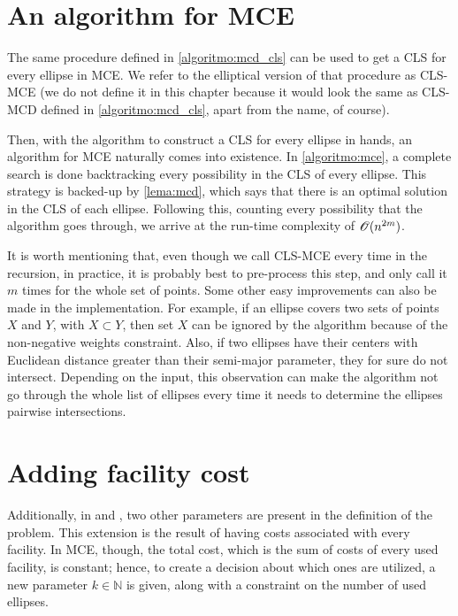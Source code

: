 \section{An algorithm for MCE}

The same procedure defined in \autoref{algoritmo:mcd_cls} can be used to get a CLS for every ellipse in MCE. We refer to the elliptical version of that procedure as CLS-MCE (we do not define it in this chapter because it would look the same as CLS-MCD defined in \autoref{algoritmo:mcd_cls}, apart from the name, of course). 

Then, with the algorithm to construct a CLS for every ellipse in hands, an algorithm for MCE naturally comes into existence. In \autoref{algoritmo:mce}, a complete search is done backtracking every possibility in the CLS of every ellipse. This strategy is backed-up by \autoref{lema:mcd}, which says that there is an optimal solution in the CLS of each ellipse. 
Following this, counting every possibility that the algorithm goes through, we arrive at the run-time complexity of $\mathscr{O}(n^{2m})$.

It is worth mentioning that, even though we call CLS-MCE every time in the recursion, in practice, it is probably best to pre-process this step, and only call it $m$ times for the whole set of points.
Some other easy improvements can also be made in the implementation. For example, if an ellipse covers two sets of points $X$ and $Y$, with $X \subset Y$, then set $X$ can be ignored by the algorithm because of the non-negative weights constraint. Also, if two ellipses have their centers with Euclidean distance greater than their semi-major parameter, they for sure do not intersect. Depending on the input, this observation can make the algorithm not go through the whole list of ellipses every time it needs to determine the ellipses pairwise intersections.

\section{Adding facility cost}

Additionally, in  and , two other parameters are present in the definition of the problem. This extension is the result of having costs associated with every facility.
In MCE, though, the total cost, which is the sum of costs of every used facility, is constant; hence, to create a decision about which ones are utilized, a new parameter $k\in\mathbb{N}$ is given, along with a constraint on the number of used ellipses.

